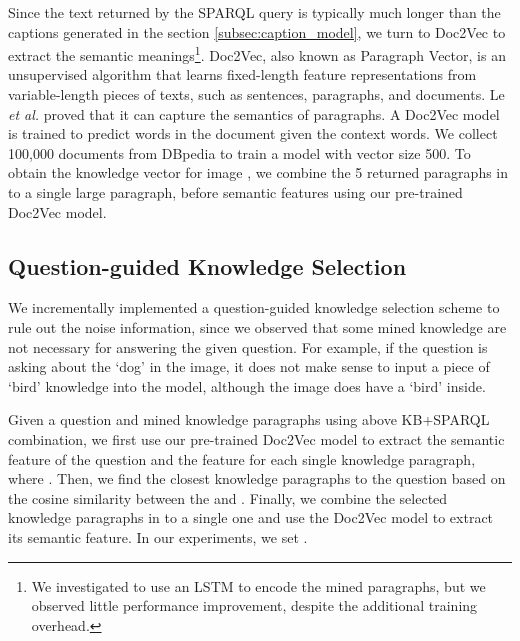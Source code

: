 \documentclass[10pt,journal,compsoc]{IEEEtran}
\newcommand{\etal}{\emph{et al.}}
\begin{document}
Since the text returned by the SPARQL query is typically much longer than the captions generated in the section \ref{subsec:caption_model}, we turn to Doc2Vec \cite{le2014distributed} to extract the semantic meanings\footnote{We investigated to use an LSTM to encode the mined paragraphs, but we observed little performance improvement, despite the additional training overhead.}. Doc2Vec, also known as Paragraph Vector, is an unsupervised algorithm that learns fixed-length feature representations from variable-length pieces of texts, such as sentences, paragraphs, and documents. Le \etal \cite{le2014distributed}  proved that it can capture the semantics of paragraphs. A Doc2Vec model is trained to predict words in the document given the context words. We collect 100,000 documents from  DBpedia to train a model with vector size 500. To obtain the knowledge vector  for image , we combine the 5 returned paragraphs in to a single large paragraph, before semantic features using our pre-trained Doc2Vec model.

\vspace{-10pt}
\subsection{Question-guided Knowledge Selection}
\label{subsec:selected}
We incrementally implemented a question-guided knowledge selection scheme to rule out the noise information, since we observed that some mined knowledge are not necessary for answering the given question. For example, if the question is asking about the `dog' in the image, it does not make sense to input a piece of `bird' knowledge into the model, although the image does have a `bird' inside.

Given a question  and mined  knowledge paragraphs using above KB+SPARQL combination, we first use our pre-trained Doc2Vec model to extract the semantic feature  of the question and the feature  for each single knowledge paragraph, where . Then, we find the  closest knowledge paragraphs to the question based on the cosine similarity between the  and . Finally, we combine the  selected knowledge paragraphs in to a single one and use the Doc2Vec model to extract its semantic feature. In our experiments, we set .
\end{document}
